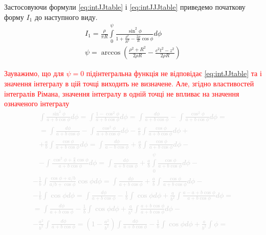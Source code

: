Застосовуючи формули \eqref{eq:intJJtable} і \eqref{eq:intJJJtable} приведемо 
початкову форму $ I_1 $ до наступного виду.
%
\begin{equation*} \begin{aligned}
I_1 = \frac{\rho}{\pi R} \int\limits_{0}^{\psi}
\frac{\sin^2{\phi}}{1 + \frac{\rho^2}{R^2} - 
\frac{2 \rho}{R} \cos \phi} d \phi \\
\psi = \arccos \left( \frac{\rho^2 + R^2}{2 \rho R} - 
\frac{c^2 t^2 - z^2}{2 \rho R} \right)
\end{aligned} \end{equation*}

\textcolor{red} {Зауважимо, що для $ \psi = 0 $ підінтегральна функція не 
відповідає \eqref{eq:intJJtable} та і значення інтегралу в цій точці виходить не 
визначене. Але, згідно властивостей інтегралів Рімана, значення інтегралу в одній 
точці не впливає на значення означеного інтегралу}
%
\textcolor{lightgray}{ \begin{equation*} \begin{aligned}
\int \frac{\sin^2{\phi}}{a + b \cos \phi} d \phi = 
\int \frac{1 - \cos^2{\phi}}{a + b \cos \phi} d \phi = 
\int\frac{d \phi}{a + b \cos \phi}  -
\int \frac{\cos^2{\phi}}{a + b \cos \phi} d \phi = \\
= \int \frac{d \phi}{a + b \cos \phi}  - 
\int \frac{\cos^2{\phi}}{a + b \cos \phi} d \phi -
\frac{a}{b} \int \frac{\cos \phi}{a + b \cos \phi} d \phi + \\
+ \frac{a}{b} \int \frac{\cos \phi}{a + b \cos \phi} d \phi = 
\int \frac{d \phi}{a - b \cos \phi} +
\frac{a}{b} \int \frac{\cos \phi}{a + b \cos \phi} d \phi - \\
- \int \frac{\cos^2{\phi} + \frac{a}{b} \cos \phi} {a + b \cos \phi} d \phi =
\int \frac{d \phi}{a + b \cos \phi} + 
\frac{a}{b} \int\limits_{0}^{\psi} \frac{\cos \phi}{a + b \cos \phi} d \phi -
\end{aligned} \end{equation*} }
%
\textcolor{lightgray}{ \begin{equation*} \begin{aligned}
- \frac{1}{b} \int \frac{\cos \phi + a/b} {a/b +  \cos \phi} \cos \phi d \phi = 
\int \frac{d \phi}{a + b \cos \phi} + 
\frac{a}{b} \int \frac{\cos \phi}{a + b \cos \phi} d \phi - \\
- \frac{1}{b} \int \cos \phi d \phi = \int \frac{d \phi}{a + b \cos \phi} - 
\frac{1}{b} \int \cos \phi d \phi + \frac{a}{b^2} \int
\frac{a - a + b \cos \phi}{a + b \cos \phi} d \phi = \\ 
= \int\frac{d \phi}{a + b \cos \phi} - \frac{1}{b} \int \cos \phi d \phi +
\frac{a}{b^2} \int \frac{a + b \cos \phi}{a + b \cos \phi} d \phi - \\ 
- \frac{a^2}{b^2} \int \frac{d \phi}{a + b \cos \phi} = 
\left( 1 - \frac{a^2}{b^2} \right) \int\frac{d \phi}{a + b \cos \phi} - 
\frac{1}{b} \int \cos \phi d \phi + \frac{a}{b^2} \int \phi =
\end{aligned} \end{equation*} }
